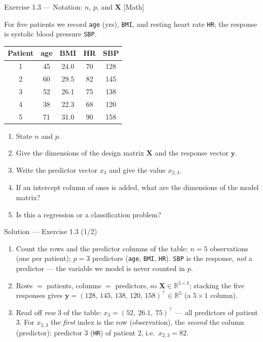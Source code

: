 \documentclass[aspectratio=169,11pt]{beamer}
\begin{document}
\begin{frame}{Exercise 1.3 --- Notation: $n$, $p$, and $\mathbf{X}$ [Math]}
\begin{exercise}
For five patients we record \texttt{age} (yrs), \texttt{BMI}, and
resting heart rate \texttt{HR}; the response is systolic blood
pressure \texttt{SBP}.
\begin{center}\vspace{-2mm}\footnotesize
\begin{tabular}{cccc|c}
\toprule
Patient & age & BMI & HR & SBP \\
\midrule
1 & 45 & 24.0 & 70 & 128 \\
2 & 60 & 29.5 & 82 & 145 \\
3 & 52 & 26.1 & 75 & 138 \\
4 & 38 & 22.3 & 68 & 120 \\
5 & 71 & 31.0 & 90 & 158 \\
\bottomrule
\end{tabular}
\end{center}\vspace{-3mm}
\begin{enumerate}\setlength\itemsep{0pt}
  \item State $n$ and $p$.
  \item Give the dimensions of the design matrix $\mathbf{X}$ and the
        response vector $\mathbf{y}$.
  \item Write the predictor vector $x_3$ and give the value $x_{2,3}$.
  \item If an intercept column of ones is added, what are the
        dimensions of the model matrix?
  \item Is this a regression or a classification problem?
\end{enumerate}
\end{exercise}
\end{frame}

\begin{frame}{Solution --- Exercise 1.3 (1/2)}
\begin{solutionbox}
\begin{enumerate}
  \item Count the rows and the predictor columns of the table:
        $n = 5$ observations (one per patient); $p = 3$ predictors
        (\texttt{age}, \texttt{BMI}, \texttt{HR}). \texttt{SBP} is the
        response, \emph{not} a predictor --- the variable we model is
        never counted in $p$.
  \item Rows $=$ patients, columns $=$ predictors, so
        $\mathbf{X}\in\mathbb{R}^{5\times 3}$; stacking the five
        responses gives
        $\mathbf{y}=(128,\,145,\,138,\,120,\,158)^\top
        \in\mathbb{R}^{5}$ (a $5\times1$ column).
  \item Read off \emph{row} 3 of the table:
        $x_3 = (52,\ 26.1,\ 75)^\top$ --- all predictors of patient 3.
        For $x_{2,3}$ the \emph{first} index is the row (observation),
        the \emph{second} the column (predictor): predictor $3$
        (\texttt{HR}) of patient $2$, i.e.\ $x_{2,3}=82$.
\end{enumerate}
\end{solutionbox}
\end{frame}
\end{document}
